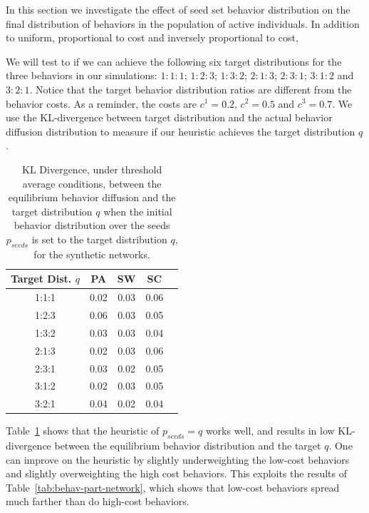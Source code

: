 \documentclass[letterpaper]{article}
\theoremstyle{plain} 		\newtheorem{thm}{Theorem}[section]
\theoremstyle{definition} 	\newtheorem{defn}[thm]{Definition}
\theoremstyle{remark}		\newtheorem{rem}{Remark}
\begin{document}
In this section we investigate the effect of seed set behavior distribution on the final distribution of behaviors in the population of active individuals. In addition to uniform, proportional to cost and inversely proportional to cost, 

We will test to if we can achieve the following six target distributions for the three behaviors in our simulations: $1:1:1$; $1:2:3$; $1:3:2$; $2:1:3$; $2:3:1$; $3:1:2$ and $3:2:1$. Notice that the target behavior distribution ratios are different from the behavior costs. As a reminder, the costs are $c^1=0.2$, $c^2=0.5$ and $c^3=0.7$.  We use the KL-divergence between target distribution and the actual behavior diffusion distribution to measure if our heuristic achieves the target distribution $q$.

\begin{table}[htb]\footnotesize
\centering
  \caption{KL Divergence, under threshold average conditions, between the equilibrium behavior diffusion and the target distribution $q$ when the initial behavior distribution over the seeds $p_{seeds}$ is set to the target distribution $q$, for the synthetic networks.}\label{tab:kl-div-threshold}
    \begin{tabular}{ccccc} \toprule
        Target Dist. $q$ & PA & SW & SC  \\ \midrule
        1:1:1 & 0.02 & 0.03 & 0.06 \\
        1:2:3 & 0.06 & 0.03 & 0.05 \\
        1:3:2 & 0.03 & 0.03 & 0.04 \\
        2:1:3 & 0.02 & 0.03 & 0.06 \\
        2:3:1 & 0.03 & 0.02 & 0.05 \\
        3:1:2 & 0.02 & 0.03 & 0.05 \\
        3:2:1 & 0.04 & 0.02 & 0.04 \\ \bottomrule 
    \end{tabular}
\end{table}

Table~\ref{tab:kl-div-threshold} shows that the heuristic of $p_{seeds} = q$ works well, and results in low KL-divergence between the equilibrium behavior distribution and the target $q$. One can improve on the heuristic by slightly underweighting the low-cost behaviors and slightly overweighting the high cost behaviors. This exploits the results of Table~\ref{tab:behav-part-network}, which shows that low-cost behaviors spread much farther than do high-cost behaviors.
\end{document}
